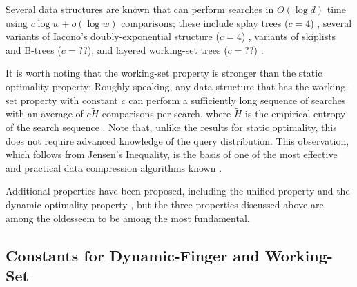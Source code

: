 \documentclass{patmorin}
\begin{document}
\begin{description}
    Several data structures are known that can perform searches
    in $O(\log d)$ time using $c\log w+o(\log w)$ comparisons;
    these include splay trees ($c=4$) \cite{X}, several variants of
    Iacono's doubly-exponential structure ($c=4$) \cite{X}, variants
    of skiplists and B-trees ($c=??$), and layered working-set trees
    ($c=??$) \cite{hXX}.

    It is worth noting that the working-set property is stronger than the
    static optimality property:  Roughly speaking, any data structure
    that has the working-set property with constant $c$ can perform a
    sufficiently long sequence of searches with an average of $c\tilde{H}$
    comparisons per search, where $\tilde{H}$ is the empirical entropy of
    the search sequence \cite{X,Y}.  Note that, unlike the results for
    static optimality, this does not require advanced knowledge of the
    query distribution.  This observation, which follows from Jensen's
    Inequality, is the basis of one of the most effective and practical
    data compression algorithms known \cite{mtf-compression,bzip}.

\end{description}
Additional properties have been proposed, including the unified property
\cite{IXX} and the dynamic optimality property \cite{X}, but the three
properties discussed above are among the oldesseem to be among the most fundamental.


\subsection{Constants for Dynamic-Finger and Working-Set}
\end{document}
